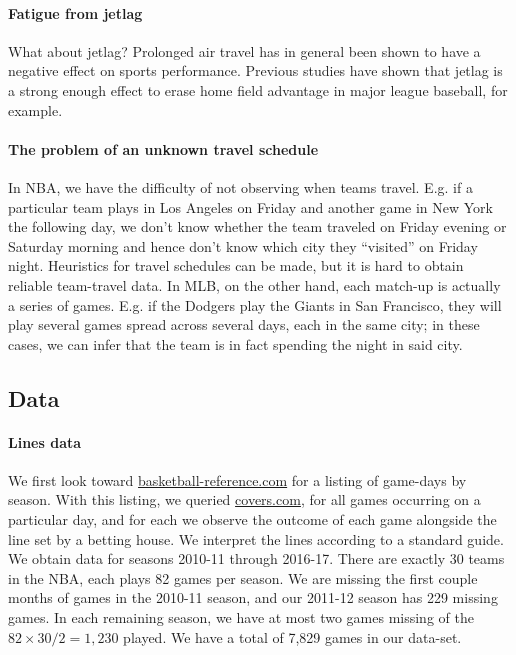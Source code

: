 \documentclass[letterpaper,12pt]{article}
\begin{document}
\paragraph{Fatigue from jetlag}
What about jetlag? Prolonged air travel has in general been shown
to have a negative effect on sports performance.\cite{leeandgalvez}
Previous studies have shown that jetlag is a strong enough effect
to erase home field advantage in major league baseball, for example.\cite{songetal}

\paragraph{The problem of an unknown travel schedule} In NBA, we have the difficulty of not observing when teams travel. E.g. if a particular team  plays
in Los Angeles on Friday and another game in New York the following day, we don't
know whether the team traveled on Friday evening or Saturday morning and hence don't know
which city they ``visited'' on Friday night. Heuristics for
travel schedules can be made, but it is hard to obtain reliable team-travel data.
In MLB, on the other hand, each match-up is actually a series of games. E.g.
if the Dodgers play the Giants in San Francisco, they will play several games spread
across several days, each in the same city; in these cases, we can infer that the team
is in fact spending the night in said city.


\subsection{Data}
\paragraph{Lines data} We first look toward 
\href{http://www.basketball-reference.com/leagues/}{basketball-reference.com}
for a listing of game-days by season. With this listing, we queried \href{http://www.covers.com/sports/NBA/matchups?selectedDate=2011-1-01}{covers.com},
for all games occurring on a particular day, and for each we observe the
outcome of each game alongside the line set by a betting house. We interpret the lines
according to a standard guide.\cite{hrisports} We obtain
data for seasons 2010-11 through 2016-17. There are exactly 30 teams in the NBA,
each plays 82 games per season.
We are missing the first couple months of games 
in the 2010-11 season, and our 2011-12 season has 229 missing games. In each remaining
season, we have at most two games missing of the $82 \times 30 / 2 = 1,230$ played.
We have a total of 7,829 games in our data-set.
\end{document}

